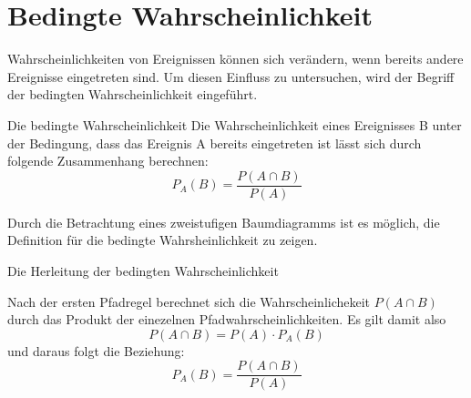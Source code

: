 \section{Bedingte Wahrscheinlichkeit}
Wahrscheinlichkeiten von Ereignissen können sich verändern, wenn bereits andere Ereignisse eingetreten sind. Um diesen Einfluss zu untersuchen, wird der Begriff der bedingten Wahrscheinlichkeit eingeführt.
\begin{defi}{Die bedingte Wahrscheinlichkeit}{}
   Die Wahrscheinlichkeit eines Ereignisses B unter der Bedingung, dass das Ereignis A bereits eingetreten ist lässt sich durch folgende Zusammenhang berechnen: $$P_A(B) = \dfrac{P(A\cap B)}{P(A)}$$   
\end{defi}
Durch die Betrachtung eines zweistufigen Baumdiagramms ist es möglich, die Definition für die bedingte Wahrsheinlichkeit zu zeigen.
\begin{merke*}{Die Herleitung der bedingten Wahrscheinlichkeit}{}
\begin{multicols}{2}

Nach der ersten Pfadregel berechnet sich die Wahrscheinlichekeit $P(A\cap B)$ durch das Produkt der einezelnen Pfadwahrscheinlichkeiten. Es gilt damit also $$P(A\cap B) = P(A) \cdot P_{A}(B)$$ und daraus folgt die Beziehung: $$P_{A}(B) = \dfrac{P(A \cap B)}{P(A)}$$
\end{multicols}
\end{merke*}